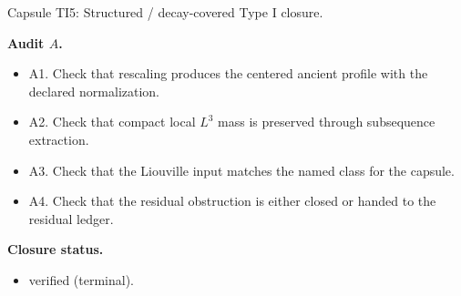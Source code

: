 \documentclass[11pt]{amsart}
\newcommand{\capsulefield}[1]{\par\smallskip\noindent\textbf{#1.}\ }
\begin{document}
\begin{proofcapsule}{Capsule TI5: Structured / decay-covered Type I closure.}
  \capsulefield{Audit \(A\)}
  \begin{itemize}[leftmargin=1.8em]
  \item A1. Check that rescaling produces the centered ancient profile with the declared normalization.
  \item A2. Check that compact local $L^3$ mass is preserved through subsequence extraction.
  \item A3. Check that the Liouville input matches the named class for the capsule.
  \item A4. Check that the residual obstruction is either closed or handed to the residual ledger.
  \end{itemize}
  \capsulefield{Closure status}
  \begin{itemize}[leftmargin=1.8em]
  \item verified (terminal).
  \end{itemize}
\end{proofcapsule}
\end{document}
